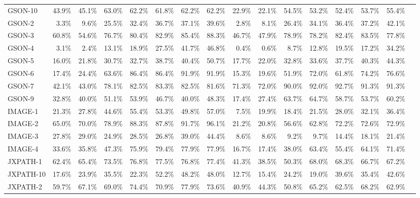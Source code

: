 \begin{tabular}{ l rrrrrrr rrrrrrrr}
GSON-10 & 43.9\% & 45.1\% & 63.0\% & 62.2\% & 61.8\% & 62.2\% & 62.2\% & 22.9\% & 22.1\% & 54.5\% & 53.2\% & 52.4\% & 53.7\% & 55.4\%\\ 
GSON-2 & 3.3\% & 9.6\% & 25.5\% & 32.4\% & 36.7\% & 37.1\% & 39.6\% & 2.8\% & 8.1\% & 26.4\% & 34.1\% & 36.4\% & 37.2\% & 42.1\%\\ 
GSON-3 & 60.8\% & 54.6\% & 76.7\% & 80.4\% & 82.9\% & 85.4\% & 88.3\% & 46.7\% & 47.9\% & 78.9\% & 78.2\% & 82.4\% & 83.5\% & 77.8\%\\ 
GSON-4 & 3.1\% & 2.4\% & 13.1\% & 18.9\% & 27.5\% & 41.7\% & 46.8\% & 0.4\% & 0.6\% & 8.7\% & 12.8\% & 19.5\% & 17.2\% & 34.2\%\\ 
GSON-5 & 16.0\% & 21.8\% & 30.7\% & 32.7\% & 38.7\% & 40.4\% & 50.7\% & 17.7\% & 22.0\% & 32.8\% & 33.6\% & 37.7\% & 40.3\% & 44.3\%\\ 
GSON-6 & 17.4\% & 24.4\% & 63.6\% & 86.4\% & 86.4\% & 91.9\% & 91.9\% & 15.3\% & 19.6\% & 51.9\% & 72.0\% & 61.8\% & 74.2\% & 76.6\%\\ 
GSON-7 & 42.1\% & 43.0\% & 78.1\% & 82.5\% & 83.3\% & 82.5\% & 81.6\% & 71.3\% & 72.0\% & 90.0\% & 92.0\% & 92.7\% & 91.3\% & 91.3\%\\ 
GSON-9 & 32.8\% & 40.0\% & 51.1\% & 53.9\% & 46.7\% & 40.0\% & 48.3\% & 17.4\% & 27.4\% & 63.7\% & 64.7\% & 58.7\% & 53.7\% & 60.2\%\\ 
IMAGE-1 & 21.3\% & 27.8\% & 44.6\% & 55.4\% & 53.3\% & 49.8\% & 57.0\% & 7.5\% & 19.9\% & 18.4\% & 21.5\% & 28.0\% & 32.1\% & 36.4\%\\ 
IMAGE-2 & 65.0\% & 70.0\% & 78.9\% & 88.3\% & 87.8\% & 91.7\% & 96.1\% & 21.2\% & 20.8\% & 56.6\% & 62.8\% & 72.2\% & 72.6\% & 72.9\%\\ 
IMAGE-3 & 27.8\% & 29.0\% & 24.9\% & 28.5\% & 26.8\% & 39.0\% & 44.4\% & 8.6\% & 8.6\% & 9.2\% & 9.7\% & 14.4\% & 18.1\% & 21.4\%\\ 
IMAGE-4 & 33.6\% & 35.8\% & 47.3\% & 75.9\% & 79.4\% & 77.9\% & 77.9\% & 16.7\% & 17.4\% & 38.0\% & 63.4\% & 55.4\% & 64.1\% & 71.4\%\\ 
JXPATH-1 & 62.4\% & 65.4\% & 73.5\% & 76.8\% & 77.5\% & 76.8\% & 77.4\% & 41.3\% & 38.5\% & 50.3\% & 68.0\% & 68.3\% & 66.7\% & 67.2\%\\ 
JXPATH-10 & 17.6\% & 23.9\% & 35.5\% & 22.3\% & 52.2\% & 48.2\% & 48.0\% & 12.7\% & 15.4\% & 24.2\% & 19.0\% & 39.6\% & 35.4\% & 42.6\%\\ 
JXPATH-2 & 59.7\% & 67.1\% & 69.0\% & 74.4\% & 70.9\% & 77.9\% & 73.6\% & 40.9\% & 44.3\% & 50.8\% & 65.2\% & 62.5\% & 68.2\% & 62.9\%\\ 

\end{tabular}
